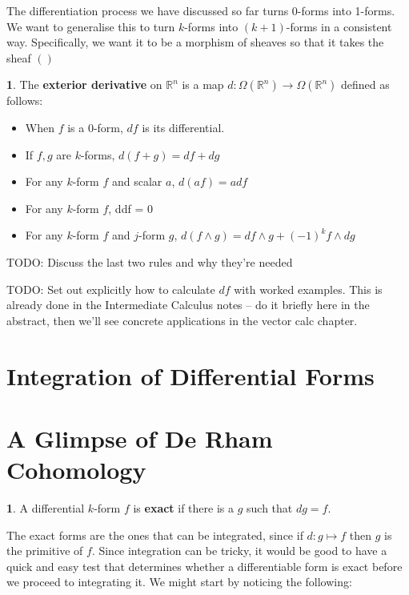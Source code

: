 \documentclass[oneside,english]{amsbook}
\numberwithin{section}{chapter}
\theoremstyle{plain}
\theoremstyle{definition}
\newtheorem{defn}[thm]{\protect\definitionname}
\providecommand{\definitionname}{Definition}
\begin{document}
			The differentiation process we have discussed so far turns 0-forms into 1-forms. We want to generalise this to turn $k$-forms into $(k+1)$-forms in a consistent way. Specifically, we want it to be a morphism of sheaves so that it takes the sheaf $()$
			
			\begin{defn}
				The \textbf{exterior derivative} on $\mathbb{R}^n$ is a map $d:\Omega(\mathbb{R}^n)\to \Omega(\mathbb{R}^n)$ defined as follows:
				\begin{itemize}
					\item When $f$ is a 0-form, $df$ is its differential.
					\item If $f, g$ are $k$-forms, $d(f + g) = df + dg$
					\item For any $k$-form $f$ and scalar $a$, $d(af) = adf$
					\item For any $k$-form $f$, ddf = 0
					\item For any $k$-form $f$ and $j$-form $g$, $d(f\wedge g) = df\wedge g + (-1)^kf\wedge dg$
				\end{itemize}
			\end{defn}
			
			TODO: Discuss the last two rules and why they're needed
			
			TODO: Set out explicitly how to calculate $df$ with worked examples. This is already done in the Intermediate Calculus notes -- do it briefly here in the abstract, then we'll see concrete applications in the vector calc chapter.
			
	
		\section{Integration of Differential Forms}
		
			

		\section{A Glimpse of De Rham Cohomology}
		
			\begin{defn}
				A differential $k$-form $f$ is \textbf{exact} if there is a $g$ such that $dg = f$. 
			\end{defn}
			
			The exact forms are the ones that can be integrated, since if $d:g\mapsto f$ then $g$ is the primitive of $f$. Since integration can be tricky, it would be good to have a quick and easy test that determines whether a differentiable form is exact before we proceed to integrating it. We might start by noticing the following:
\end{document}
